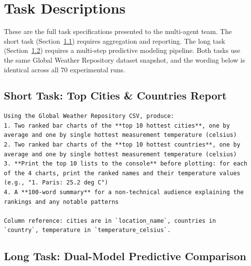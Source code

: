 \chapter{Task Descriptions}
\label{app:tasks}

These are the full task specifications presented to the multi-agent team.
The short task (Section~\ref{app:short-task}) requires aggregation and reporting. 
The long task (Section~\ref{app:long-task}) requires a multi-step predictive modeling pipeline.
Both tasks use the same Global Weather Repository dataset snapshot, and the wording below is identical across all 70 experimental runs.

\section{Short Task: Top Cities \& Countries Report}
\label{app:short-task}

\begin{lstlisting}[basicstyle=\small\ttfamily, breaklines=true, frame=single, caption={Short task specification (\texttt{config/tasks/short\_task.md})}]
Using the Global Weather Repository CSV, produce:
1. Two ranked bar charts of the **top 10 hottest cities**, one by average and one by single hottest measurement temperature (celsius)
2. Two ranked bar charts of the **top 10 hottest countries**, one by average and one by single hottest measurement temperature (celsius)
3. **Print the top 10 lists to the console** before plotting: for each of the 4 charts, print the ranked names and their temperature values (e.g., "1. Paris: 25.2 deg C")
4. A **100-word summary** for a non-technical audience explaining the rankings and any notable patterns

Column reference: cities are in `location_name`, countries in `country`, temperature in `temperature_celsius`.
\end{lstlisting}

\clearpage
\section{Long Task: Dual-Model Predictive Comparison}
\label{app:long-task}

